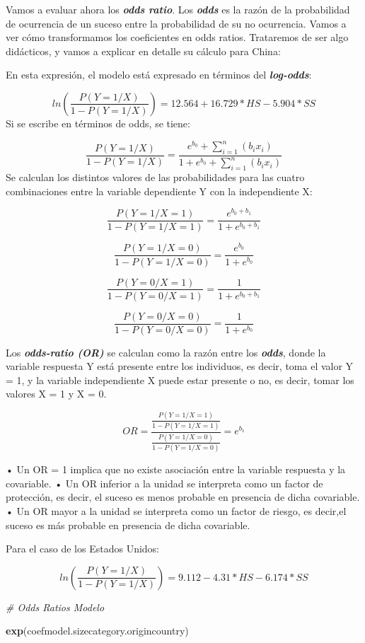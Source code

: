 \documentclass[
]{article}
\newenvironment{Shaded}{\begin{snugshade}}{\end{snugshade}}
\newcommand{\CommentTok}[1]{\textcolor[rgb]{0.56,0.35,0.01}{\textit{#1}}}
\newcommand{\KeywordTok}[1]{\textcolor[rgb]{0.13,0.29,0.53}{\textbf{#1}}}
\newcommand{\NormalTok}[1]{#1}
\begin{document}
Vamos a evaluar ahora los \textbf{\emph{odds ratio}}. Los
\textbf{\emph{odds}} es la razón de la probabilidad de ocurrencia de un
suceso entre la probabilidad de su no ocurrencia. Vamos a ver cómo
transformamos los coeficientes en odds ratios. Trataremos de ser algo
didácticos, y vamos a explicar en detalle su cálculo para China:

En esta expresión, el modelo está expresado en términos del
\textbf{\emph{log-odds}}:

\[
ln({\frac{P(Y=1/X)}{1-P(Y=1/X)}}) = 12.564 + 16.729 * HS  - 5.904 * SS
\] Si se escribe en términos de odds, se tiene:

\[
{\frac{P(Y=1/X)}{1-P(Y=1/X)}} = {\frac{e^{b_0}+ \sum_{i= 1}^{n}(b_{i}x_{i})}{1+e^{b_0}+\sum_{i= 1}^{n}(b_{i}x_{i})}}
\] Se calculan los distintos valores de las probabilidades para las
cuatro combinaciones entre la variable dependiente Y con la
independiente X:

\[
{\frac{P(Y=1/X=1)}{1-P(Y=1/X=1)}} = {\frac{e^{b_0+b_1}}{1+e^{b_0+b_1}}}
\]

\[
{\frac{P(Y=1/X=0)}{1-P(Y=1/X=0)}} = {\frac{e^{b_0}}{1+e^{b_0}}}
\]

\[
{\frac{P(Y=0/X=1)}{1-P(Y=0/X=1)}} = {\frac{1}{1+e^{b_0+b_1}}}
\]

\[
{\frac{P(Y=0/X=0)}{1-P(Y=0/X=0)}} = {\frac{1}{1+e^{b_0}}}
\]

Los \textbf{\emph{odds-ratio (OR)}} se calculan como la razón entre los
\textbf{\emph{odds}}, donde la variable respuesta Y está presente entre
los individuos, es decir, toma el valor Y = 1, y la variable
independiente X puede estar presente o no, es decir, tomar los valores X
= 1 y X = 0.

\[
OR = {\frac{{\frac{P(Y=1/X=1)}{1-P(Y=1/X=1)}}}{{\frac{P(Y=1/X=0)}{1-P(Y=1/X=0)}}}} = {e^{b_1}}
\]

• Un OR = 1 implica que no existe asociación entre la variable respuesta
y la covariable. • Un OR inferior a la unidad se interpreta como un
factor de protección, es decir, el suceso es menos probable en presencia
de dicha covariable. • Un OR mayor a la unidad se interpreta como un
factor de riesgo, es decir,el suceso es más probable en presencia de
dicha covariable.

Para el caso de los Estados Unidos:

\[
ln({\frac{P(Y=1/X)}{1-P(Y=1/X)}}) = 9.112 -4.31 * HS - 6.174 * SS 
\]

\begin{Shaded}
\begin{Highlighting}[]
\CommentTok{# Odds Ratios Modelo }

\KeywordTok{exp}\NormalTok{(coefmodel.sizecategory.origincountry)}
\end{Highlighting}
\end{Shaded}
\end{document}

